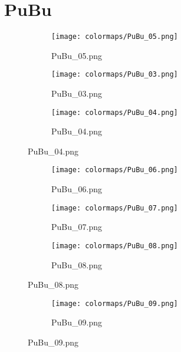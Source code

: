 \documentclass{article}%
\begin{document}
%
\newpage%
\section{PuBu}%
\label{sec:PuBu}%
\hspace{1cm}\hfill%
\hspace{1cm}\hfill%
\hspace{1cm}\hfill%


\begin{figure}[h!]%
\begin{subfigure}[b]{0.3\linewidth}%
\texttt{[image: colormaps/PuBu\_05.png]}%
\caption{PuBu\_05.png}%
\end{subfigure}%
\begin{subfigure}[b]{0.3\linewidth}%
\texttt{[image: colormaps/PuBu\_03.png]}%
\caption{PuBu\_03.png}%
\end{subfigure}%
\begin{subfigure}[b]{0.3\linewidth}%
\texttt{[image: colormaps/PuBu\_04.png]}%
\caption{PuBu\_04.png}%
\end{subfigure}%
\end{figure}

%
\hspace{1cm}\hfill%
\hspace{1cm}\hfill%
\hspace{1cm}\hfill%


\begin{figure}[h!]%
\begin{subfigure}[b]{0.3\linewidth}%
\texttt{[image: colormaps/PuBu\_06.png]}%
\caption{PuBu\_06.png}%
\end{subfigure}%
\begin{subfigure}[b]{0.3\linewidth}%
\texttt{[image: colormaps/PuBu\_07.png]}%
\caption{PuBu\_07.png}%
\end{subfigure}%
\begin{subfigure}[b]{0.3\linewidth}%
\texttt{[image: colormaps/PuBu\_08.png]}%
\caption{PuBu\_08.png}%
\end{subfigure}%
\end{figure}

%
\hspace{1cm}\hfill%


\begin{figure}[h!]%
\begin{subfigure}[b]{0.3\linewidth}%
\texttt{[image: colormaps/PuBu\_09.png]}%
\caption{PuBu\_09.png}%
\end{subfigure}%
\end{figure}
\end{document}
